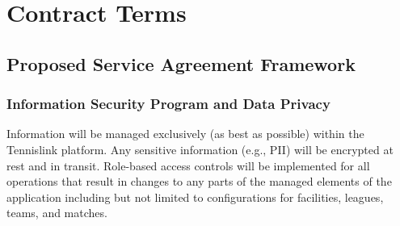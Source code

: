 \section{Contract Terms}

\subsection{Proposed Service Agreement Framework}

\subsubsection{Information Security Program and Data Privacy}

Information will be managed exclusively (as best as possible) within the Tennislink platform.  Any sensitive information (e.g., PII) will be encrypted at rest and in transit.  Role-based access controls will be implemented for all operations that result in changes to any parts of the managed elements of the application including but not limited to configurations for facilities, leagues, teams, and matches.  






